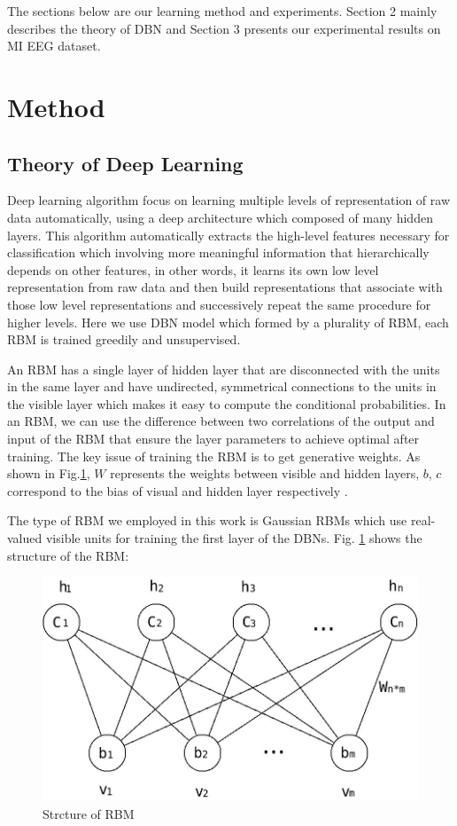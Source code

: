 \documentclass{llncs}
\begin{document}
The sections below are our learning method and experiments. Section 2 mainly describes the theory of DBN and Section 3 presents our experimental results on MI EEG dataset.


\section{Method}

%
\subsection{Theory of Deep Learning}
%
Deep learning algorithm focus on learning multiple levels of representation of raw data automatically, using a deep architecture which composed of many hidden layers. This algorithm automatically extracts the high-level features necessary for classification which involving more meaningful information that hierarchically depends on other features, in other words, it learns its own low level representation from raw data and then build representations that associate with those low level representations and successively repeat the same procedure for higher levels. Here we use DBN model which formed by a plurality of RBM, each RBM is trained greedily and unsupervised\cite{5}.


An RBM has a single layer of hidden layer that are disconnected with the units in the same layer and have undirected, symmetrical connections to the units in the visible layer which makes it easy to compute the conditional probabilities. In an RBM, we can use the difference between two correlations of the output and input of the RBM that ensure the layer parameters to achieve optimal after training. The key issue of training the RBM is to get generative weights. As shown in Fig.\ref{fig:1}, $W$ represents the weights between visible and hidden layers, $b$, $c$ correspond to the bias of visual and hidden layer respectively \cite{3}.


The type of RBM we employed in this work is Gaussian RBMs which use real-valued visible units for training the first layer of the DBNs. Fig. \ref{fig:1} shows the structure of the RBM:
\begin{figure}[!htbp]
	\centering
		\includegraphics[scale=0.23]{figs/kdp1.jpeg}
		\caption{Strcture of RBM}  
    	\label{fig:1}
\end{figure}
\end{document}
